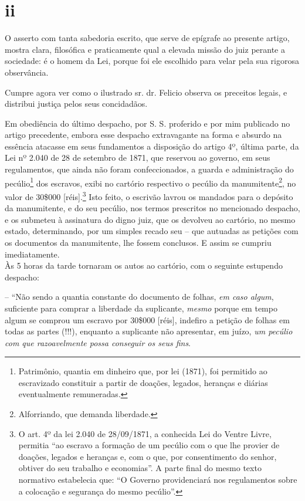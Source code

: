 \section{ii}

O asserto com tanta sabedoria escrito, que serve de epígrafe ao presente
artigo, mostra clara, filosófica e praticamente qual a elevada missão do
juiz perante a sociedade: é o homem da Lei, porque foi ele escolhido
para velar pela sua rigorosa observância.

Cumpre agora ver como o ilustrado sr. dr. Felicio observa os preceitos
legais, e distribui justiça pelos seus concidadãos.

Em obediência do último despacho, por S. S. proferido e por mim
publicado no artigo precedente, embora esse despacho extravagante na
forma e absurdo na essência atacasse em seus fundamentos a disposição do
artigo 4º, última parte, da Lei nº 2.040 de 28 de setembro de 1871, que 
reservou ao governo, em seus regulamentos, que ainda não foram
confeccionados, a guarda e administração do pecúlio\footnote{
  Patrimônio, quantia em dinheiro que, por lei (1871), foi permitido ao
  escravizado constituir a partir de doações, legados, heranças e
  diárias eventualmente remuneradas.} dos escravos, exibi no cartório
respectivo o pecúlio da manumitente\footnote{ Alforriando, que demanda
  liberdade.}, no valor de 30\$000 {[}réis{]}.\footnote{ O art. 4º da
  lei 2.040 de 28/09/1871, a conhecida Lei do Ventre Livre, permitia ``ao
  escravo a formação de um pecúlio com o que lhe provier de doações,
  legados e heranças e, com o que, por consentimento do senhor, obtiver
  do seu trabalho e economias''. A parte final do mesmo texto normativo
  estabelecia que: ``O Governo providenciará nos regulamentos sobre a
  colocação e segurança do mesmo pecúlio''.} Isto feito, o escrivão
lavrou os mandados para o depósito da manumitente, e do seu pecúlio, nos
termos prescritos no mencionado despacho, e os submeteu à assinatura do
digno juiz, que os devolveu ao cartório, no mesmo estado, determinando,
por um simples recado seu -- que autuadas as petições com os documentos
da manumitente, lhe fossem conclusos. E assim se cumpriu
imediatamente.\\
Às 5 horas da tarde tornaram os autos ao cartório, com o seguinte
estupendo despacho:

-- ``Não sendo a quantia constante do documento de folhas, \emph{em caso
algum}, suficiente para comprar a liberdade da suplicante, \emph{mesmo}
porque em tempo algum se comprou um escravo por 30\$000 {[}réis{]},
indefiro a petição de folhas em todas as partes (!!!), enquanto a
suplicante não apresentar, em juízo, \emph{um pecúlio com que
razoavelmente possa conseguir os seus fins}.

